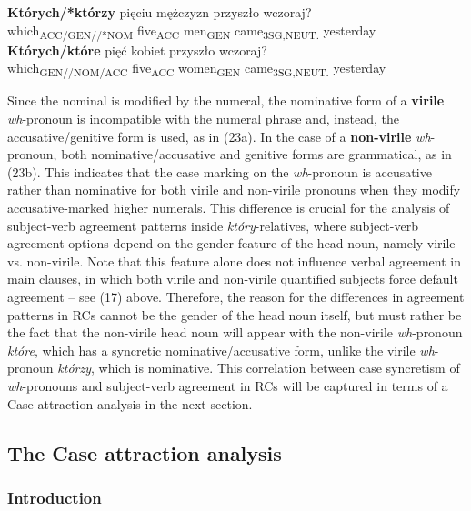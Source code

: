 \documentclass[output=paper]{langsci/langscibook}
\begin{document}
\ea%
    \label{ex:leska:23}
    \ea
    \gll \textbf{Których/*którzy}   pięciu   mężczyzn   przyszło    wczoraj?\\
         which\textsubscript{ACC/GEN//*NOM} five\textsubscript{ACC} men\textsubscript{GEN}  came\textsubscript{3SG,NEUT.} yesterday\\
    \ex
    \gll \textbf{Których/które}  pięć     kobiet   przyszło     wczoraj?\\
         which\textsubscript{GEN//NOM/ACC} five\textsubscript{ACC} women\textsubscript{GEN}   came\textsubscript{3SG,NEUT.} yesterday\\
    \z
\z

Since the nominal is modified by the numeral, the nominative form of a \textbf{virile} \textit{wh}{}-pronoun is incompatible with the numeral phrase and, instead, the accusative/genitive form is used, as in (23a). In the case of a \textbf{non-virile} \textit{wh}{}-pronoun, both nominative/accusative and genitive forms are grammatical, as in (23b). This indicates that the case marking on the \textit{wh}{}-pronoun is accusative rather than nominative for both virile and non-virile pronouns when they modify accusative-marked higher numerals. This difference is crucial for the analysis of subject-verb agreement patterns inside \textit{który}{}-relatives, where subject-verb agreement options depend on the gender feature of the head noun, namely virile vs. non-virile. Note that this feature alone does not influence verbal agreement in main clauses, in which both virile and non-virile quantified subjects force default agreement – see (17) above. Therefore, the reason for the differences in agreement patterns in RCs cannot be the gender of the head noun itself, but must rather be the fact that the non-virile head noun will appear with the non-virile \textit{wh}{}-pronoun \textit{które}, which has a syncretic nominative/accusative form, unlike the virile \textit{wh}{}-pronoun \textit{którzy}, which is nominative. This correlation between case syncretism of \textit{wh}{}-pronouns and subject-verb agreement in RCs will be captured in terms of a Case attraction analysis in the next section.

\subsection{The Case attraction analysis}%
\subsubsection{Introduction}
\end{document}
